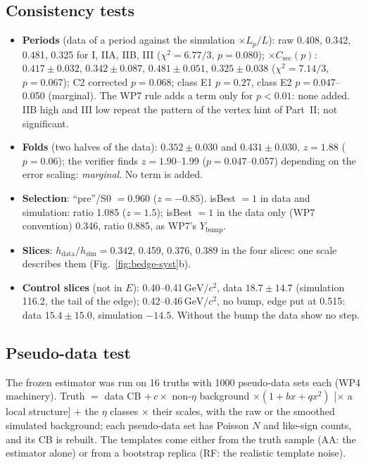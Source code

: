 \documentclass[11pt,a4paper]{article}
\newcommand{\GeVcc}{\ensuremath{\mathrm{GeV}/c^{2}}\xspace}
\newcommand{\Ybump}{\ensuremath{Y_{\mathrm{bump}}}\xspace}
\newcommand{\Csec}{\ensuremath{C_{\mathrm{sec}}}\xspace}
\begin{document}
\subsection{Consistency tests}
\label{sec:bedge-tests}
\begin{itemize}\setlength{\itemsep}{1pt}
\item \textbf{Periods} (data of a period against the simulation $\times L_p/L$): raw 0.408, 0.342, 0.481, 0.325 for I, IIA, IIB, III ($\chi^2=6.77/3$,
      $p=0.080$); $\times\Csec(p)$: $0.417\pm0.032$, $0.342\pm0.087$, $0.481\pm0.051$, $0.325\pm0.038$ ($\chi^2=7.14/3$, $p=0.067$); C2 corrected
      $p=0.068$; class E1 $p=0.27$, class E2 $p=0.047$--0.050 (marginal). The WP7 rule adds a term only for $p<0.01$: none added. IIB high and III low
      repeat the pattern of the vertex hint of Part~II; not significant.
\item \textbf{Folds} (two halves of the data): $0.352\pm0.030$ and $0.431\pm0.030$, $z=1.88$ ($p=0.06$); the verifier finds $z=1.90$--1.99
      ($p=0.047$--0.057) depending on the error scaling: \emph{marginal}. No term is added.
\item \textbf{Selection}: ``pre''/S0 $=0.960$ ($z=-0.85$). isBest $=1$ in data and simulation: ratio 1.085 ($z=1.5$); isBest $=1$ in the data only
      (WP7 convention) 0.346, ratio 0.885, as WP7's \Ybump.
\item \textbf{Slices}: $h_{\mathrm{data}}/h_{\mathrm{sim}}=0.342$, 0.459, 0.376, 0.389 in the four slices: one scale describes them
      (Fig.~\ref{fig:bedge-syst}b).
\item \textbf{Control slices} (not in $E$): 0.40--0.41\,\GeVcc, data $18.7\pm14.7$ (simulation 116.2, the tail of the edge); 0.42--0.46\,\GeVcc,
      no bump, edge put at 0.515: data $15.4\pm15.0$, simulation $-14.5$. Without the bump the data show no step.
\end{itemize}

\subsection{Pseudo-data test}
\label{sec:bedge-toys}
The frozen estimator was run on 16 truths with 1000 pseudo-data sets each (WP4 machinery). Truth $=$ data CB $+\,c\times$ non-$\eta$ background
$\times(1+bx+qx^2)$ [$\times$ a local structure] $+$ the $\eta$ classes $\times$ their scales, with the raw or the smoothed simulated background;
each pseudo-data set has Poisson $N$ and like-sign counts, and its CB is rebuilt. The templates come either from the truth sample (AA: the
estimator alone) or from a bootstrap replica (RF: the realistic template noise).
\end{document}
